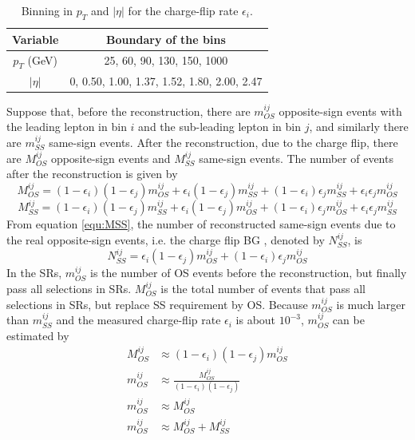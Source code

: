 \begin{table}[htbp]
\centering
\begin{tabular}{|c|c|}
\hline
Variable & Boundary of the bins \\
\hline
$p_T$ (GeV) &  25, 60, 90, 130, 150, 1000 \\
\hline
$|\eta|$ & 0, 0.50, 1.00, 1.37, 1.52, 1.80, 2.00, 2.47 \\
\hline
\end{tabular}
\caption{Binning in $p_T$ and $|\eta|$ for the charge-flip rate $\epsilon_i$.}
\label{tab:binning_charge_flip}
\end{table}

Suppose that, before the reconstruction, there are $m^{ij}_{OS}$ opposite-sign events with the leading lepton in bin $i$ and the sub-leading lepton in bin $j$, and similarly there are $m^{ij}_{SS}$ same-sign events.
After the reconstruction, due to the charge flip, there are $M^{ij}_{OS}$ opposite-sign events and $M^{ij}_{SS}$ same-sign events.
The number of events after the reconstruction is given by
\begin{equation}
M^{ij}_{OS} = (1-\epsilon_i) (1-\epsilon_j) m^{ij}_{OS} + \epsilon_i (1-\epsilon_j) m^{ij}_{SS} + (1-\epsilon_i) \epsilon_j m^{ij}_{SS} + \epsilon_i \epsilon_j m^{ij}_{OS}
\end{equation}
\begin{equation}
M^{ij}_{SS} = (1-\epsilon_i) (1-\epsilon_j) m^{ij}_{SS} + \epsilon_i (1-\epsilon_j) m^{ij}_{OS} + (1-\epsilon_i) \epsilon_j m^{ij}_{OS} + \epsilon_i \epsilon_j m^{ij}_{SS}
\label{equ:MSS}
\end{equation}
From equation \ref{equ:MSS}, the number of reconstructed same-sign events due to the real opposite-sign events, i.e. the charge flip BG , denoted by $N^{ij}_{SS}$, is
\begin{equation}
N^{ij}_{SS} = \epsilon_i (1-\epsilon_j) m^{ij}_{OS} + (1-\epsilon_i) \epsilon_j m^{ij}_{OS}
\label{equ:NSS}
\end{equation}
In the SRs, $m^{ij}_{OS}$ is the number of OS events before the reconstruction, but finally pass all selections in SRs.
$M^{ij}_{OS}$ is the total number of events that pass all selections in SRs, but replace SS requirement by OS.
Because $m^{ij}_{OS}$ is much larger than $m^{ij}_{SS}$ and the measured charge-flip rate $\epsilon_i$ is about $10^{-3}$, $m^{ij}_{OS}$ can be estimated by
\begin{align}
M^{ij}_{OS} &\approx (1-\epsilon_i) (1-\epsilon_j) m^{ij}_{OS} \\
m^{ij}_{OS} &\approx \frac{ M^{ij}_{OS} }{ (1-\epsilon_i) (1-\epsilon_j) }
\label{equ:mapp1} \\
m^{ij}_{OS} &\approx M^{ij}_{OS} \\
m^{ij}_{OS} &\approx M^{ij}_{OS} + M^{ij}_{SS}
\label{equ:mapp2}
\end{align}
